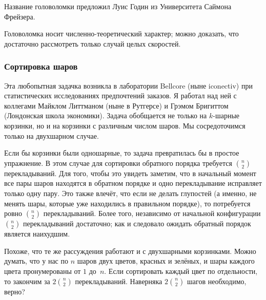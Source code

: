 \medskip

Название головоломки предложил Луис Годин из Университета Саймона Фрейзера.

Головоломка носит численно-теоретический характер;
можно доказать, что достаточно рассмотреть только случай целых скоростей.

\subsubsection*{Сортировка шаров}

Эта любопытная задачка возникла в лаборатории Bellcore (ныне iconectiv) при статистических исследованиях предпочтений заказов.
Я работал над ней с коллегами Майклом Литтманом (ныне в Рутгерсе) и Грэмом Бригиттом (Лондонская школа экономики).
Задача обобщается не только на $k$-шарные корзинки, но и на корзинки с различным числом шаров.
Мы сосредоточимся только на двухшарном случае.

\medskip

Если бы корзинки были одношарные, то задача превратилась бы в простое упражнение.
В этом случае для сортировки обратного порядка требуется $\binom{n}{2}$ перекладываний.
Для того, чтобы это увидеть заметим, что в начальный момент все пары шаров находятся в обратном порядке и одно перекладывание исправляет только одну пару.
Это также влечёт, что если не делать глупостей (а именно, не менять шары, которые уже находились в правильном порядке), то потребуется ровно $\binom{n}{2}$ перекладываний.
Более того, независимо от начальной конфигурации $\binom{n}{2}$ перекладываний достаточно; как и следовало ожидать обратный порядок является наихудшим.

\medskip

Похоже, что те же рассуждения работают и с двухшарными корзинками.
Можно думать, что у нас по $n$ шаров двух цветов, красных и зелёных, и шары каждого цвета пронумерованы от $1$ до~$n$.
Если сортировать каждый цвет по отдельности, то закончим за $2\binom{n}{2}$ перекладываний.
Наверняка $2\binom{n}{2}$ шагов необходимо, верно?

